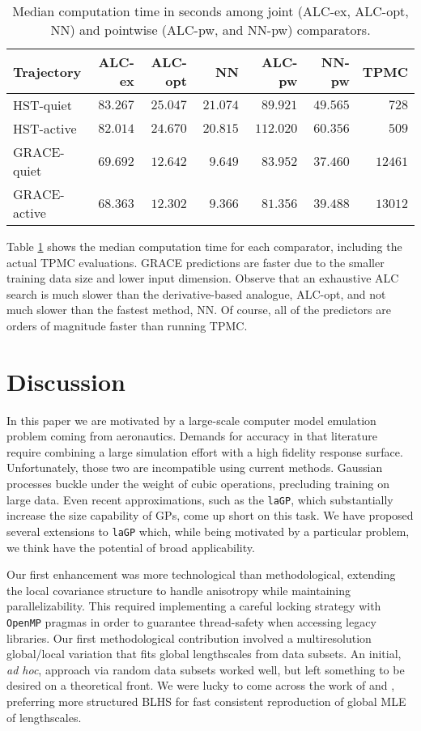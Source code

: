 \documentclass[12pt]{article}
\begin{document}
\begin{table}[ht!]
\centering
\begin{tabular}{l|rrrrrr}
{\bfseries Trajectory} & {\bfseries ALC-ex} & {\bfseries ALC-opt} & {\bfseries NN} & {\bfseries ALC-pw} & {\bfseries NN-pw} & {\bfseries TPMC} \\ 
  \hline
HST-quiet & $\ 83.267$ & $\ 25.047$ & $\ 21.074$ & $\ 89.921$ & $\ 49.565$ & $\ 728$ \\ 
  HST-active &  $\ 82.014$ &  $\ 24.670$ &  $\ 20.815$ & $\ 112.020$ &  $\ 60.356$ & $\ 509$ \\ 
  GRACE-quiet & $\ 69.692$ & $\ 12.642$ &  $\ 9.649$ & $\ 83.952$ & $\ 37.460$ & $\ 12461$ \\ 
  GRACE-active & $\ 68.363$ & $\ 12.302$ &  $\ 9.366$ & $\ 81.356$ & $\ 39.488$ & $\ 13012$
\end{tabular}
\caption{Median computation time in seconds among joint (ALC-ex, ALC-opt, NN) and pointwise (ALC-pw, and NN-pw) comparators.}
\label{t:UQ_time}
\end{table}

Table \ref{t:UQ_time} shows the median computation time for each comparator,
including the actual TPMC evaluations. GRACE predictions are faster due to the
smaller training data size and lower input dimension.  Observe that an exhaustive ALC
search is much slower than the derivative-based analogue, ALC-opt, and not much
slower than the fastest method, NN.  Of course, all of the predictors are
orders of magnitude faster than running TPMC.

\section{Discussion}
\label{sec:discuss}

In this paper we are motivated by a large-scale computer model emulation
problem coming from aeronautics.  Demands for accuracy in that literature
require combining a large simulation effort with a high fidelity response
surface.  Unfortunately, those two are incompatible using current methods.
Gaussian processes buckle under the weight of cubic operations, precluding
training on large data.  Even recent approximations, such as the {\tt laGP}, which substantially increase the
size capability of GPs, come up short on this task.  We have proposed several
extensions to {\tt laGP} which, while being motivated by a particular problem,
we think have the potential of broad applicability.

Our first enhancement was more technological than methodological, extending
the local covariance structure to handle anisotropy while maintaining
parallelizability.  This required implementing a careful locking strategy with
{\tt OpenMP} pragmas in order to guarantee thread-safety when accessing legacy
libraries.  Our first methodological contribution involved a multiresolution
global/local variation that fits global lengthscales from data subsets.  An
initial, {\em ad hoc}, approach via random data subsets worked well, but left
something to be desired on a theoretical front.  We were lucky to come across
the work of \citet{liu:2014} and \citet{liu:hung:2015}, preferring more
structured BLHS for fast
consistent reproduction of global MLE of lengthscales. 
\end{document}
